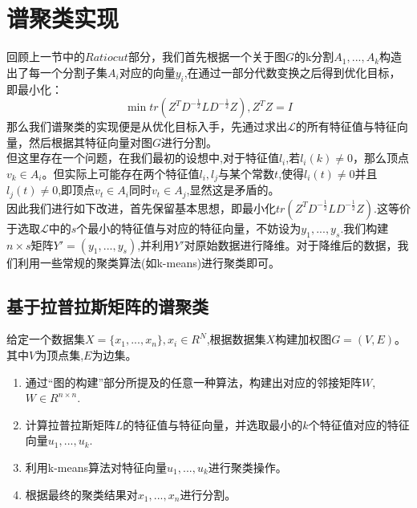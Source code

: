 \documentclass[11pt]{scrartcl}
\begin{document}
\section{谱聚类实现}
回顾上一节中的$Ratiocut$部分，我们首先根据一个关于图$G$的k分割$A_1,...,A_k$构造出了每一个分割子集$A_i$对应的向量$y_i$,在通过一部分代数变换之后得到优化目标，即最小化：
$$
\min{tr(Z^T D^{-\frac12} L D^{-\frac12} Z)},Z^TZ=I
$$
那么我们谱聚类的实现便是从优化目标入手，先通过求出$\mathscr{L}$的所有特征值与特征向量，然后根据其特征向量对图$G$进行分割。\\
但这里存在一个问题，在我们最初的设想中,对于特征值$l_i$,若$l_i(k)\not =0$，那么顶点$v_k\in A_i$。但实际上可能存在两个特征值$l_i,l_j$与某个常数$t$,使得$l_i(t)\not = 0$并且$l_j(t)\not = 0$,即顶点$v_t\in A_i$同时$v_t\in A_j$,显然这是矛盾的。\\
因此我们进行如下改进，首先保留基本思想，即最小化$tr(Z^T D^{-\frac12} L D^{-\frac12} Z)$.这等价于选取$\mathscr{L}$中的$s$个最小的特征值与对应的特征向量，不妨设为$y_{1},...,y_s$.我们构建$n\times s$矩阵$Y'=(y_1,...,y_s)$,并利用$Y'$对原始数据进行降维。对于降维后的数据，我们利用一些常规的聚类算法(如k-means)进行聚类即可。


\subsection{基于拉普拉斯矩阵的谱聚类}
给定一个数据集$X=\{x_1,...,x_n\},x_i\in R^N$,根据数据集$X$构建加权图$G=(V,E)$。其中$V$为顶点集,$E$为边集。
\begin{enumerate}[(i.)]
\item 通过“图的构建”部分所提及的任意一种算法，构建出对应的邻接矩阵$W$,$W\in R^{n\times n}$.
\item 计算拉普拉斯矩阵$L$的特征值与特征向量，并选取最小的$k$个特征值对应的特征向量$u_1,...,u_k$.
\item 利用k-means算法对特征向量$u_1,...,u_k$进行聚类操作。
\item 根据最终的聚类结果对$x_1,...,x_n$进行分割。


\end{enumerate}
\end{document}
